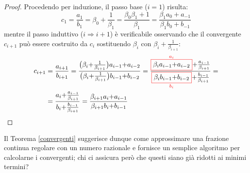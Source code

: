 \documentclass[twoside,symmetric,justified,openany,nobib]{tufte-book}
\begin{document}
\begin{proof}
  Procedendo per induzione, il passo base ($i{=}1$) risulta:
  \[
    c_1 = \frac{a_1}{b_1} = \beta_0{+}\frac{1}{\beta_1} = \frac{\beta_0\beta_1{+}1}{\beta_1} = \frac{\beta_1a_0{+}a_{-1}}{\beta_1b_0{+}b_{-1}}
  \]
  mentre il passo induttivo ($i{\Rightarrow}i{+}1$) è verificabile osservando che il convergente $c_{i+1}$ può essere costruito da $c_i$ sostituendo $\beta_i$ con $\beta_i{+}\frac{1}{\beta_{i+1}}$:
  \[
    \begin{split}
      c_{i+1} &= \frac{a_{i+1}}{b_{i+1}} = \frac{\bigl(\beta_i{+}\frac{1}{\beta_{i+1}}\bigr)a_{i-1}{+}a_{i-2}}{\bigl(\beta_i{+}\frac{1}{\beta_{i+1}}\bigr)b_{i-1}{+}b_{i-2}}
      = \frac{{\color{red}\overset{a_i}{\boxed{\color{black}\beta_ia_{i-1}{+}a_{i-2}}}}{+}\frac{a_{i-1}}{\beta_{i+1}}}{{\color{red}\underset{b_i}{\boxed{\color{black}\beta_ib_{i-1}{+}b_{i-2}}}}{+}\frac{b_{i-1}}{\beta_{i+1}}}=\\
      &= \frac{a_i{+}\frac{a_{i-1}}{\beta_{i+1}}}{b_i{+}\frac{b_{i-1}}{\beta_{i+1}}} = \frac{\beta_{i+1}a_i{+}a_{i-1}}{\beta_{i+1}b_i{+}b_{i-1}}
    \end{split}
  \]
\end{proof}

\noindent
Il Teorema \ref{convergenti} suggerisce dunque come approssimare una frazione continua regolare con un numero razionale e fornisce un semplice algoritmo per calcolarne i convergenti; chi ci assicura però che questi siano già ridotti ai minimi termini?
\end{document}
